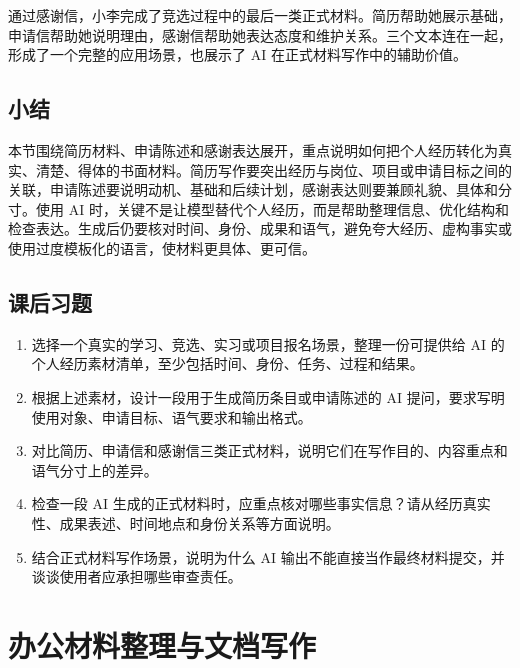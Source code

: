 通过感谢信，小李完成了竞选过程中的最后一类正式材料。简历帮助她展示基础，申请信帮助她说明理由，感谢信帮助她表达态度和维护关系。三个文本连在一起，形成了一个完整的应用场景，也展示了 AI 在正式材料写作中的辅助价值。

\subsection*{小结}
本节围绕简历材料、申请陈述和感谢表达展开，重点说明如何把个人经历转化为真实、清楚、得体的书面材料。简历写作要突出经历与岗位、项目或申请目标之间的关联，申请陈述要说明动机、基础和后续计划，感谢表达则要兼顾礼貌、具体和分寸。使用 AI 时，关键不是让模型替代个人经历，而是帮助整理信息、优化结构和检查表达。生成后仍要核对时间、身份、成果和语气，避免夸大经历、虚构事实或使用过度模板化的语言，使材料更具体、更可信。
\bigskip

\subsection*{课后习题}
\begin{enumerate}
\setlength{\itemsep}{6pt}

\item 选择一个真实的学习、竞选、实习或项目报名场景，整理一份可提供给 AI 的个人经历素材清单，至少包括时间、身份、任务、过程和结果。

\item 根据上述素材，设计一段用于生成简历条目或申请陈述的 AI 提问，要求写明使用对象、申请目标、语气要求和输出格式。

\item 对比简历、申请信和感谢信三类正式材料，说明它们在写作目的、内容重点和语气分寸上的差异。

\item 检查一段 AI 生成的正式材料时，应重点核对哪些事实信息？请从经历真实性、成果表述、时间地点和身份关系等方面说明。

\item 结合正式材料写作场景，说明为什么 AI 输出不能直接当作最终材料提交，并谈谈使用者应承担哪些审查责任。

\end{enumerate}

\newpage

\section{办公材料整理与文档写作}

